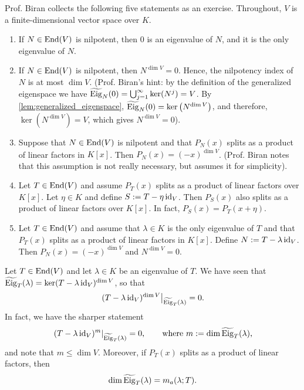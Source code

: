 \begin{exercise}
\label{exc:nilpotent_properties}
Prof. Biran collects the following five statements as an exercise. Throughout, $V$ is a finite-di\-men\-sional vector space over $K$.
\begin{enumerate}[label=\textbf{(\alph*)}]
    \item If $N \in \operatorname{End}(V)$ is nilpotent, then $0$ is an eigenvalue of $N$, and it is the only eigenvalue of $N$.
    \item If $N \in \operatorname{End}(V)$ is nilpotent, then $N^{\dim V} = 0$. Hence, the nilpotency index of $N$ is at most $\dim V$. (Prof. Biran's hint: by the definition of the generalized eigenspace we have $\widetilde{\operatorname{Eig}}_N(0) = \bigcup_{j=1}^\infty \ker(N^j) = V$. By \cref{lem:generalized_eigenspace}, $\widetilde{\operatorname{Eig}}_N(0) = \ker\left(N^{\dim V}\right)$, and therefore, $\ker\left(N^{\dim V}\right) = V$, which gives $N^{\dim V} = 0$).
    \item Suppose that $N \in \operatorname{End}(V)$ is nilpotent and that $P_N(x)$ splits as a product of linear factors in $K[x]$. Then $P_N(x) = (-x)^{\dim V}$. (Prof. Biran notes that this assumption is not really necessary, but assumes it for simplicity).
    \item Let $T \in \operatorname{End}(V)$ and assume $P_T(x)$ splits as a product of linear factors over $K[x]$. Let $\eta \in K$ and define $S := T - \eta \operatorname{id}_V$. Then $P_S(x)$ also splits as a product of linear factors over $K[x]$. In fact, $P_S(x) = P_T(x + \eta)$.
    \item Let $T \in \operatorname{End}(V)$ and assume that $\lambda \in K$ is the only eigenvalue of $T$ and that $P_T(x)$ splits as a product of linear factors in $K[x]$. Define $N := T - \lambda \operatorname{id}_V$. Then $P_N(x) = (-x)^{\dim V}$ and $N^{\dim V} = 0$.
\end{enumerate}
\end{exercise}

\begin{corollary}
\label{cor:nilpotency_on_generalized_eigenspace}
Let $T \in \operatorname{End}(V)$ and let $\lambda \in K$ be an eigenvalue of $T$. We have seen that $\widetilde{\operatorname{Eig}}_T(\lambda) = \ker(T - \lambda \operatorname{id}_V)^{\dim V}$, so that
\[
    \left. (T - \lambda \operatorname{id}_V)^{\dim V} \right|_{\widetilde{\operatorname{Eig}}_T(\lambda)} = 0.
\]
In fact, we have the sharper statement
\[
    \left. (T - \lambda \operatorname{id}_V)^{m} \right|_{\widetilde{\operatorname{Eig}}_T(\lambda)} = 0, \qquad \text{where } m := \dim \widetilde{\operatorname{Eig}}_T(\lambda),
\]
and note that $m \le \dim V$. Moreover, if $P_T(x)$ splits as a product of linear factors, then
\[
    \dim \widetilde{\operatorname{Eig}}_T(\lambda) = m_a(\lambda; T).
\]
\end{corollary}

